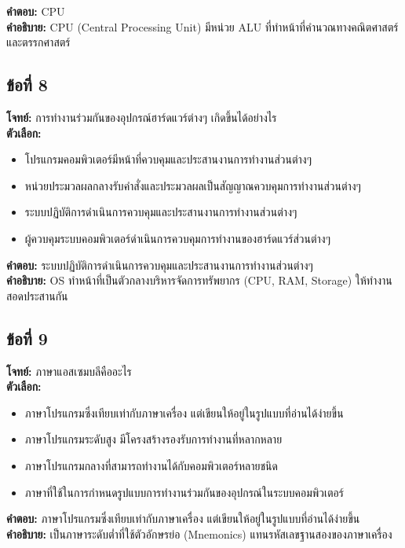 \documentclass[12pt]{article}
\begin{document}
\textbf{คำตอบ:} CPU\\
\textbf{คำอธิบาย:} CPU (Central Processing Unit) มีหน่วย ALU ที่ทำหน้าที่คำนวณทางคณิตศาสตร์และตรรกศาสตร์

\subsection*{ข้อที่ 8}
\textbf{โจทย์:} การทำงานร่วมกันของอุปกรณ์ฮาร์ดแวร์ต่างๆ เกิดขึ้นได้อย่างไร\\
\textbf{ตัวเลือก:}
\begin{itemize}
    \item โปรแกรมคอมพิวเตอร์มีหน้าที่ควบคุมและประสานงานการทำงานส่วนต่างๆ
    \item หน่วยประมวลผลกลางรับคำสั่งและประมวลผลเป็นสัญญาณควบคุมการทำงานส่วนต่างๆ
    \item ระบบปฏิบัติการดำเนินการควบคุมและประสานงานการทำงานส่วนต่างๆ
    \item ผู้ควบคุมระบบคอมพิวเตอร์ดำเนินการควบคุมการทำงานของฮาร์ดแวร์ส่วนต่างๆ
\end{itemize}

\textbf{คำตอบ:} ระบบปฏิบัติการดำเนินการควบคุมและประสานงานการทำงานส่วนต่างๆ\\
\textbf{คำอธิบาย:} OS ทำหน้าที่เป็นตัวกลางบริหารจัดการทรัพยากร (CPU, RAM, Storage) ให้ทำงานสอดประสานกัน

\subsection*{ข้อที่ 9}
\textbf{โจทย์:} ภาษาแอสเซมบลีคืออะไร\\
\textbf{ตัวเลือก:}
\begin{itemize}
    \item ภาษาโปรแกรมซึ่งเทียบเท่ากับภาษาเครื่อง แต่เขียนให้อยู่ในรูปแบบที่อ่านได้ง่ายขึ้น
    \item ภาษาโปรแกรมระดับสูง มีโครงสร้างรองรับการทำงานที่หลากหลาย
    \item ภาษาโปรแกรมกลางที่สามารถทำงานได้กับคอมพิวเตอร์หลายชนิด
    \item ภาษาที่ใช้ในการกำหนดรูปแบบการทำงานร่วมกันของอุปกรณ์ในระบบคอมพิวเตอร์
\end{itemize}

\textbf{คำตอบ:} ภาษาโปรแกรมซึ่งเทียบเท่ากับภาษาเครื่อง แต่เขียนให้อยู่ในรูปแบบที่อ่านได้ง่ายขึ้น\\
\textbf{คำอธิบาย:} เป็นภาษาระดับต่ำที่ใช้ตัวอักษรย่อ (Mnemonics) แทนรหัสเลขฐานสองของภาษาเครื่อง
\end{document}
